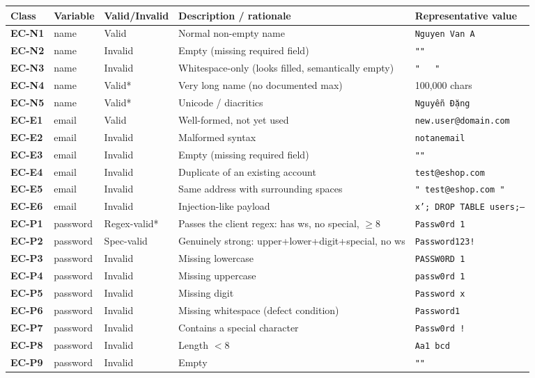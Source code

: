 \documentclass[11pt,a4paper]{article}
\newcommand{\ec}[1]{\textbf{#1}}
\begin{document}
\begin{center}
\begin{longtable}{L{1.4cm} L{1.6cm} L{1.9cm} L{5.4cm} L{3.4cm}}
\toprule
\textbf{Class} & \textbf{Variable} & \textbf{Valid/Invalid} & \textbf{Description / rationale} & \textbf{Representative value} \\
\midrule
\endhead
\ec{EC-N1} & name & Valid   & Normal non-empty name & \texttt{Nguyen Van A} \\
\ec{EC-N2} & name & Invalid & Empty (missing required field) & \verb|""| \\
\ec{EC-N3} & name & Invalid & Whitespace-only (looks filled, semantically empty) & \verb|"   "| \\
\ec{EC-N4} & name & Valid*  & Very long name (no documented max) & 100{,}000 chars \\
\ec{EC-N5} & name & Valid*  & Unicode / diacritics & \texttt{Nguyễn Đặng} \\
\midrule
\ec{EC-E1} & email & Valid   & Well-formed, not yet used & \texttt{new.user@domain.com} \\
\ec{EC-E2} & email & Invalid & Malformed syntax & \texttt{notanemail} \\
\ec{EC-E3} & email & Invalid & Empty (missing required field) & \verb|""| \\
\ec{EC-E4} & email & Invalid & Duplicate of an existing account & \texttt{test@eshop.com} \\
\ec{EC-E5} & email & Invalid & Same address with surrounding spaces & \verb|" test@eshop.com "| \\
\ec{EC-E6} & email & Invalid & Injection-like payload & \texttt{x'; DROP TABLE users;--} \\
\midrule
\ec{EC-P1} & password & Regex-valid* & Passes the client regex: has ws, no special, $\ge 8$ & \texttt{Passw0rd 1} \\
\ec{EC-P2} & password & Spec-valid & Genuinely strong: upper+lower+digit+special, no ws & \texttt{Password123!} \\
\ec{EC-P3} & password & Invalid & Missing lowercase & \texttt{PASSW0RD 1} \\
\ec{EC-P4} & password & Invalid & Missing uppercase & \texttt{passw0rd 1} \\
\ec{EC-P5} & password & Invalid & Missing digit & \texttt{Password x} \\
\ec{EC-P6} & password & Invalid & Missing whitespace (defect condition) & \texttt{Password1} \\
\ec{EC-P7} & password & Invalid & Contains a special character & \texttt{Passw0rd !} \\
\ec{EC-P8} & password & Invalid & Length $<8$ & \texttt{Aa1 bcd} \\
\ec{EC-P9} & password & Invalid & Empty & \verb|""| \\
\bottomrule
\end{longtable}
\end{center}
\end{document}
